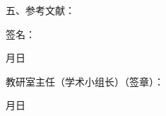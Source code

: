 \documentclass{csustThesis}
\begin{document}
\vspace{-.4\baselineskip}

\begin{ubox}[breakable]
\noindent 五、参考文献：

\nocite{*}
\printbibliography[heading=none]

\end{ubox}

\vspace{-.4\baselineskip}

\begin{ubox}
\begin{center}

    \vspace{6\baselineskip}  %

    \hspace{3cm}
    签名：\underline{\makebox[3cm][c]{}}
\end{center}

\begin{flushright}
    月\hspace{1cm}日\makebox[1.5cm]{}
\end{flushright}

\end{ubox}

\vspace{-.4\baselineskip}

\begin{ubox}
\begin{center}

    \vspace{4.67\baselineskip}  %

\end{center}

\begin{flushleft}
    教研室主任（学术小组长）（签章）：
\end{flushleft}

\begin{flushright}
    月\hspace{1cm}日\makebox[1.5cm]{}
\end{flushright}

\end{ubox}
\end{document}
